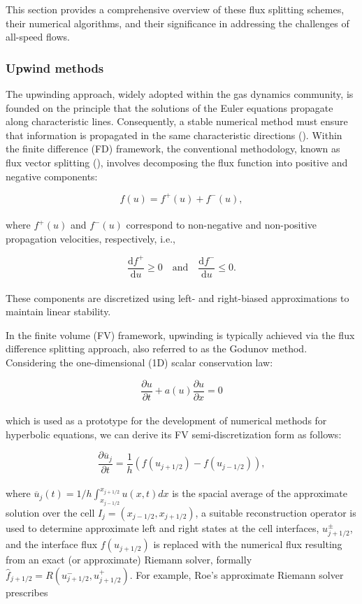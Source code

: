 \documentclass[a5paper]{sapthesis}
\begin{document}
	\noindent This section provides a comprehensive overview of these flux splitting schemes, their numerical algorithms, and their significance in addressing the challenges of all-speed flows.
	
	\subsubsection{Upwind methods}
	
	The upwinding approach, widely adopted within the gas dynamics community, is founded on the principle that the solutions of the Euler equations propagate along characteristic lines. Consequently, a stable numerical method must ensure that information is propagated in the same characteristic directions (\citet{MORETTI1979191}). Within the finite difference (FD) framework, the conventional methodology, known as flux vector splitting (\citet{STEGER1981263}), involves decomposing the flux function into positive and negative components:
	
	\begin{equation}
		f(u) = f^+(u) + f^-(u),
	\end{equation}
	\\
	where $f^+(u)$ and $f^-(u)$ correspond to non-negative and non-positive propagation velocities, respectively, i.e.,
	
	\begin{equation}
		\dfrac{\mathrm{d}f^+}{\mathrm{d}u} \geq 0 \quad \text{and} \quad \dfrac{\mathrm{d}f^-}{\mathrm{d}u} \leq 0.
	\end{equation}
	\\
	These components are discretized using left- and right-biased approximations to maintain linear stability.
	
	In the finite volume (FV) framework, upwinding is typically achieved via the flux difference splitting approach, also referred to as the Godunov method. Considering the one-dimensional (1D) scalar conservation law:
	
	\begin{equation}
		\dfrac{\partial u}{\partial t} + a(u) \dfrac{\partial u}{\partial x} = 0
		\label{conservationlaw}
	\end{equation}
	\\
	which is used as a prototype for the development of numerical methods for hyperbolic equations, we can derive its FV semi-discretization form as follows:
	
	\begin{equation}
		\dfrac{\partial \overline{u}_j}{\partial t} = \dfrac{1}{h}(f(u_{j+1/2}) - f(u_{j-1/2})),
	\end{equation}
	\\
	where $\overline{u}_j(t) = 1/h \int_{x_{j-1/2}}^{x_{j+1/2}} u(x,t) dx$ is the spacial average of the approximate solution over the cell $I_j = (x_{j-1/2},x_{j+1/2})$, a suitable reconstruction operator is used to determine approximate left and right states at the cell interfaces, $u_{j+1/2}^{\pm}$, and the interface flux $f(u_{j+1/2})$ is replaced with the numerical flux resulting from an exact (or approximate) Riemann solver, formally $\hat{f}_{j+1/2} = \textit{R}(u_{j+1/2}^{-},u_{j+1/2}^{+})$. For example, Roe's approximate Riemann solver prescribes 
	
\end{document}
